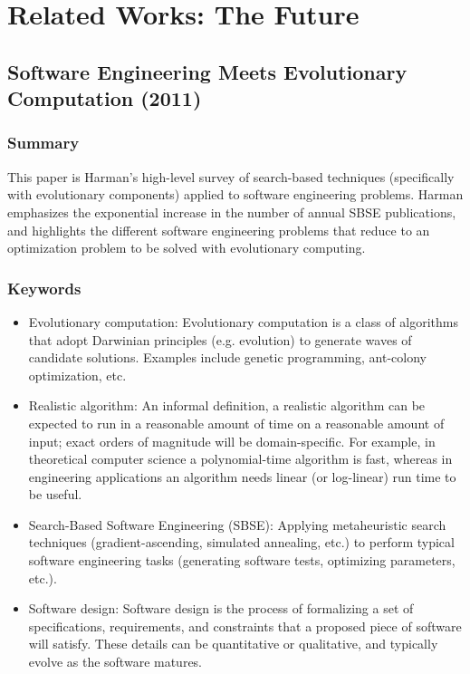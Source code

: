 \documentclass{sig-alternate-05-2015}
\begin{document}
\section{Related Works: The Future}

\subsection{Software Engineering Meets Evolutionary Computation (2011)}

\subsubsection{Summary}
This paper \cite{harman2011software} is Harman's high-level survey of search-based techniques (specifically with evolutionary components) applied to software engineering problems. Harman emphasizes the exponential increase in the number of annual SBSE publications, and highlights the different software engineering problems that reduce to an optimization problem to be solved with evolutionary computing. 

\subsubsection{Keywords}

\begin{itemize}
\item Evolutionary computation: Evolutionary computation is a class of algorithms that adopt Darwinian principles (e.g. evolution) to generate waves of candidate solutions. Examples include genetic programming, ant-colony optimization, etc.
\item Realistic algorithm: An informal definition, a realistic algorithm can be expected to run in a reasonable amount of time on a reasonable amount of input; exact orders of magnitude will be domain-specific. For example, in theoretical computer science a polynomial-time algorithm is fast, whereas in engineering applications an algorithm needs linear (or log-linear) run time to be useful.
\item Search-Based Software Engineering (SBSE): Applying metaheuristic search techniques (gradient-ascending, simulated annealing, etc.) to perform typical software engineering tasks (generating software tests, optimizing parameters, etc.).
\item Software design: Software design is the process of formalizing a set of specifications, requirements, and constraints that a proposed piece of software will satisfy. These details can be quantitative or qualitative, and typically evolve as the software matures.
\end{itemize}
\end{document}
